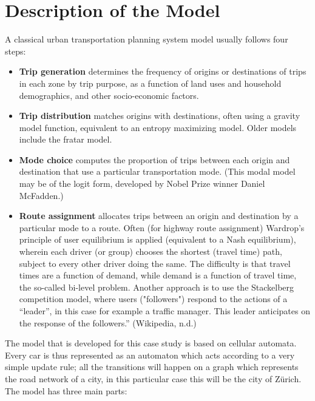 \documentclass[11pt]{article}
\begin{document}
\section{Description of the Model}
A classical urban transportation planning system model usually follows four steps\cite{mcnally2008four}:
\begin{itemize}
	\item \textbf{Trip generation} determines the frequency of origins or destinations of trips in each zone by trip purpose, as a function of land uses and household demographics, and other socio-economic factors.

	\item \textbf{Trip distribution} matches origins with destinations, often using a gravity model function, equivalent to an entropy maximizing model. Older models include the fratar model.

	\item \textbf{Mode choice} computes the proportion of trips between each origin and destination that use a particular transportation mode. (This modal model may be of the logit form, developed by Nobel Prize winner Daniel McFadden.)

	\item \textbf{Route assignment} allocates trips between an origin and destination by a particular mode to a route. Often (for highway route assignment) Wardrop's principle of user equilibrium is applied (equivalent to a Nash equilibrium), wherein each driver (or group) chooses the shortest (travel time) path, subject to every other driver doing the same. The difficulty is that travel times are a function of demand, while demand is a function of travel time, the so-called bi-level problem. Another approach is to use the Stackelberg competition model, where users ("followers") respond to the actions of a ``leader'', in this case for example a traffic manager. This leader anticipates on the response of the followers.”  (Wikipedia, n.d.)
\end{itemize}

The model that is developed for this case study is based on cellular automata. Every car is thus represented as an automaton which acts according to a very simple update rule; all the transitions will happen on a graph which represents the road network of a city, in this particular case this will be the city of Z\"urich. The model has three main parts:
\end{document}
